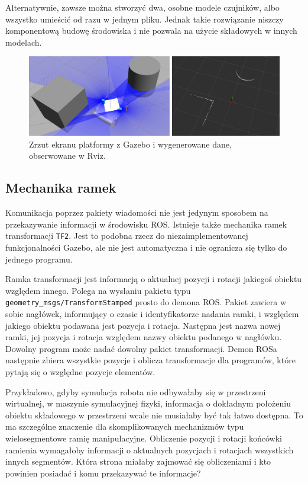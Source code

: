 		Alternatywnie, zawsze można stworzyć dwa, osobne modele czujników, albo wszystko umieścić od razu w jednym pliku.
		Jednak takie rozwiązanie niszczy komponentową budowę środowiska i nie pozwala na użycie składowych w innych modelach.
		
		\begin{figure}[h]
		\centering
		\includegraphics[width=\textwidth]{graphics/scan.png}
		\caption{Zrzut ekranu platformy z Gazebo i wygenerowane dane, obserwowane w Rviz.}
		\label{fig:scan}
		\end{figure}
		
	\subsection{Mechanika ramek}
		\label{sec:frames}
		Komunikacja poprzez pakiety wiadomości nie jest jedynym sposobem na przekazywanie informacji w środowisku ROS.
		Istnieje także mechanika ramek transformacji \texttt{TF2}.
		Jest to podobna rzecz do niezaimplementowanej funkcjonalności Gazebo, ale nie jest automatyczna i nie ogranicza się tylko do jednego programu.
		
		Ramka transformacji jest informacją o aktualnej pozycji i rotacji jakiegoś obiektu względem innego.
		Polega na wysłaniu pakietu typu \texttt{geometry\_msgs/TransformStamped} prosto do demona ROS.
		Pakiet zawiera w sobie nagłówek, informujący o czasie i identyfikatorze nadania ramki, i względem jakiego obiektu podawana jest pozycja i rotacja.
		Następna jest nazwa nowej ramki, jej pozycja i rotacja względem nazwy obiektu podanego w nagłówku.
		Dowolny program może nadać dowolny pakiet transformacji.
		Demon ROSa następnie zbiera wszystkie pozycje i oblicza transformacje dla programów, które pytają się o względne pozycje elementów.
		
		Przykładowo, gdyby symulacja robota nie odbywałaby się w przestrzeni wirtualnej, w maszynie symulacyjnej fizyki, 
		informacja o dokładnym położeniu obiektu składowego w przestrzeni wcale nie musiałaby być tak łatwo dostępna.
		To ma szczególne znaczenie dla skomplikowanych mechanizmów typu wielosegmentowe ramię manipulacyjne.
		Obliczenie pozycji i rotacji końcówki ramienia wymagałoby informacji o aktualnych pozycjach i rotacjach wszystkich innych segmentów.
		Która strona miałaby zajmować się obliczeniami i kto powinien posiadać i komu przekazywać te informacje?
		
